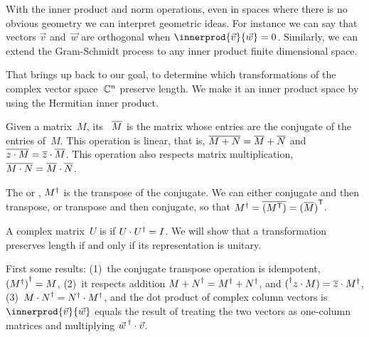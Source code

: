 With the inner product and norm operations, 
even in spaces where there is no obvious geometry
we can interpret geometric ideas. 
For instance we can say that
vectors $\vec{v}$ and~$\vec{w}$ are orthogonal when 
$\innerprod{\vec{v}}{\vec{w}}=0$.
Similarly, we can extend the Gram-Schmidt process
to any inner product finite dimensional space.

That brings up back to our goal, to determine which transformations
of the complex vector space~$\mathbb{C}^n$ preserve length.
We make it an inner product space by using the Hermitian inner product.

Given a matrix~$M$, its ~$\overline{M}$ is 
the matrix whose entries are the conjugate of the entries of~$M$.
This operation is linear, that is, 
$\overline{M+N}=\overline{M}+\overline{N}$ and 
$\overline{z\cdot M}=\overline{z}\cdot\overline{M}$.
This operation also respects matrix multiplication, 
$\overline{M\cdot N}=\overline{M}\cdot\overline{N}$.  

The  or ,
${M}^{\dagger}$
is the transpose of the conjugate.
We can either conjugate and then transpose, or transpose and 
then conjugate, so that
${M}^{\dagger}=\overline{({{M}^{\mathsf{T}}})}={{(\overline{M})}^{\mathsf{T}}}$.

A complex matrix~$U$ is  if $U\cdot{U}^{\dagger}=I$.
We will show that a transformation preserves length if and only if its
representation is unitary.

First some results:
(1)~the conjugate transpose operation is idempotent, 
${({M}^{\dagger})}^{\dagger}=M$,
(2)~it respects addition ${M+N}^{\dagger}={M}^{\dagger}+{N}^{\dagger}$,
and ${(}^{\dagger}z\cdot M)=\overline{z}\cdot{M}^{\dagger}$,
(3)~${M\cdot N}^{\dagger}={N}^{\dagger}\cdot{M}^{\dagger}$,
and the dot product of complex column vectors is 
$\innerprod{\vec{v}}{\vec{w}}$ equals the 
result of treating the two vectors as one-column matrices and 
multiplying ${\vec{w}\,}^{\dagger}\cdot \vec{v}$.

